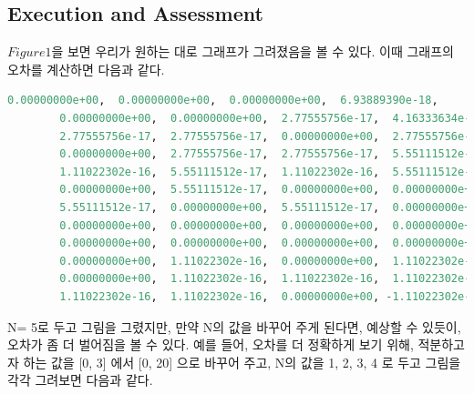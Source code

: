 \documentclass[11pt]{article}
\begin{document}
\subsection{Execution and Assessment} 
$Figure 1$을 보면 우리가 원하는 대로 그래프가 그려졌음을 볼 수 있다. 이때 그래프의 오차를 계산하면 다음과 같다.

\begin{lstlisting}[language=Python]
0.00000000e+00,  0.00000000e+00,  0.00000000e+00,  6.93889390e-18,
        0.00000000e+00,  0.00000000e+00,  2.77555756e-17,  4.16333634e-17,
        2.77555756e-17,  2.77555756e-17,  0.00000000e+00,  2.77555756e-17,
        0.00000000e+00,  2.77555756e-17,  2.77555756e-17,  5.55111512e-17,
        1.11022302e-16,  5.55111512e-17,  1.11022302e-16,  5.55111512e-17,
        0.00000000e+00,  5.55111512e-17,  0.00000000e+00,  0.00000000e+00,
        5.55111512e-17,  0.00000000e+00,  5.55111512e-17,  0.00000000e+00,
        0.00000000e+00,  0.00000000e+00,  0.00000000e+00,  0.00000000e+00,
        0.00000000e+00,  0.00000000e+00,  0.00000000e+00,  0.00000000e+00,
        0.00000000e+00,  1.11022302e-16,  0.00000000e+00,  1.11022302e-16,
        0.00000000e+00,  1.11022302e-16,  1.11022302e-16,  1.11022302e-16,
        1.11022302e-16,  1.11022302e-16,  0.00000000e+00, -1.11022302e-16,
        \end{lstlisting}

 N= 5로 두고 그림을 그렸지만, 만약 N의 값을 바꾸어 주게 된다면, 예상할 수 있듯이, 오차가 좀 더 벌어짐을 볼 수 있다. 예를 들어, 오차를 더 정확하게 보기 위해, 적분하고자 하는 값을 [0, 3] 에서 [0, 20] 으로 바꾸어 주고, N의 값을 1, 2, 3, 4 로 두고 그림을 각각 그려보면 다음과 같다.
\end{document}
